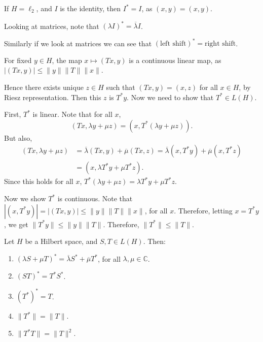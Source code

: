 \documentclass[12pt]{article}
\begin{document}
\begin{exbox}
	If $H = \ell_2$, and $I$ is the identity, then $I^{\ast} = I$, as $(x, y) = (x ,y)$.

	Looking at matrices, note that $(\lambda I)^{\ast} = \overline{\lambda} I$.

	Similarly if we look at matrices we can see that $(\text{left shift})^{\ast} = \text{right shift}$.
\end{exbox}


\begin{proofbox}
	For fixed $y \in H$, the map $x \mapsto (Tx, y)$ is a continuous linear map, as $|(Tx, y)| \leq \|y\| \|T\| \|x\|$.

	Hence there exists unique $z \in H$ such that $(Tx, y) = (x, z)$ for all $x \in H$, by Riesz representation. Then this $z$ is $T^{\ast} y$. Now we need to show that $T^{\ast} \in L(H)$.

	First, $T^{\ast}$ is linear. Note that for all $x$,
	\[
		(Tx, \lambda y + \mu z) = (x, T^{\ast}(\lambda y + \mu z)).
	\]
	But also,
	\begin{align*}
		(Tx, \lambda y + \mu z) &= \overline{\lambda} (Tx, y) + \overline{\mu} (Tx, z) = \overline{\lambda}(x, T^{\ast} y) + \overline{\mu} (x, T^{\ast} z) \\
					&= (x, \lambda T^{\ast} y + \mu T^{\ast} z).
	\end{align*}
	Since this holds for all $x$, $T^{\ast}(\lambda y + \mu z) = \lambda T^{\ast} y + \mu T^{\ast} z$.

	Now we show $T^{\ast}$ is continuous. Note that $|(x, T^{\ast} y)| = |(Tx, y)| \leq \|y\| \|T\| \|x\|$, for all $x$. Therefore, letting $x = T^{\ast} y$, we get $\| T^{\ast} y\| \leq \|y\| \| T\|$. Therefore, $\|T^{\ast}\| \leq \|T\|$.
\end{proofbox}

\begin{proposition}
	Let $H$ be a Hilbert space, and $S, T \in L(H)$. Then:
	\begin{enumerate}[\normalfont(i)]
		\item $(\lambda S + \mu T)^{\ast} = \overline{\lambda} S^{\ast} + \overline{\mu} T^{\ast}$, for all $\lambda, \mu \in \mathbb{C}$.
		\item $(ST)^{\ast} = T^{\ast} S^{\ast}$.
		\item $(T^{\ast})^{\ast} = T$.
		\item $\|T^{\ast}\| = \|T\|$.
		\item $\|T^{\ast}T\| = \|T\|^2$.
	\end{enumerate}
\end{proposition}
\end{document}
